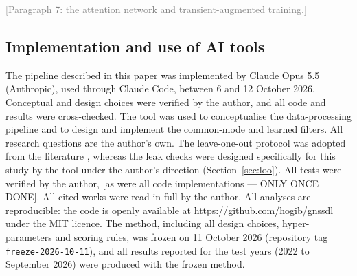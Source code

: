 \documentclass[preprint,12pt,authoryear]{elsarticle}
\newcommand{\towrite}[1]{\textcolor{gray}{[#1]}}
\begin{document}
\towrite{Paragraph 7: the attention network and transient-augmented training.}

\subsection{Implementation and use of AI tools}
\label{sec:ai}

The pipeline described in this paper was implemented by Claude Opus 5.5 (Anthropic), used through Claude Code, between 6 and 12 October 2026. Conceptual and design choices were verified by the author, and all code and results were cross-checked. The tool was used to conceptualise the data-processing pipeline and to design and implement the common-mode and learned filters. All research questions are the author's own. The leave-one-out protocol was adopted from the literature \citep{bachelot2025}, whereas the leak checks were designed specifically for this study by the tool under the author's direction (Section~\ref{sec:loo}). All tests were verified by the author, [as were all code implementations — ONLY ONCE DONE]. All cited works were read in full by the author. All analyses are reproducible: the code is openly available at \url{https://github.com/hogib/gnssdl} under the MIT licence. The method, including all design choices, hyper-parameters and scoring rules, was frozen on 11 October 2026 (repository tag \texttt{freeze-2026-10-11}), and all results reported for the test years (2022 to September 2026) were produced with the frozen method.
\end{document}
